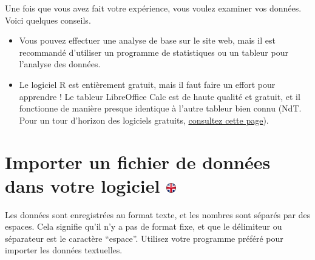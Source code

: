 \documentclass[
]{book}
\begin{document}
Une fois que vous avez fait votre expérience, vous voulez examiner vos
données. Voici quelques conseils.

\begin{itemize}
\item
  Vous pouvez effectuer une analyse de base sur le site web, mais il est
  recommandé d'utiliser un programme de statistiques ou un tableur pour
  l'analyse des données.
\item
  Le logiciel R est entièrement gratuit, mais il faut faire un effort
  pour apprendre ! Le tableur LibreOffice Calc est de haute qualité et
  gratuit, et il fonctionne de manière presque identique à l'autre
  tableur bien connu (NdT. Pour un tour d'horizon des logiciels
  gratuits,
  \href{http://www.ontostats.univ-paris8.fr/omk/s/logicielsStats/page/Typologie}{consultez
  cette page}).
\end{itemize}

\hypertarget{importer-un-fichier-de-donnuxe9es-dans-votre-logiciel}{%
\section[Importer un fichier de données dans votre logiciel
]{\texorpdfstring{Importer un fichier de données dans votre logiciel
\href{https://www.psytoolkit.org/doc3.1.0/analyze_data.html\#_importing_a_data_file_into_your_software}{\protect\includegraphics{img/ukflag.png}}}{Importer un fichier de données dans votre logiciel }}\label{importer-un-fichier-de-donnuxe9es-dans-votre-logiciel}}

Les données sont enregistrées au format texte, et les nombres sont
séparés par des espaces. Cela signifie qu'il n'y a pas de format fixe,
et que le délimiteur ou séparateur est le caractère ``espace''. Utilisez
votre programme préféré pour importer les données textuelles.
\end{document}
